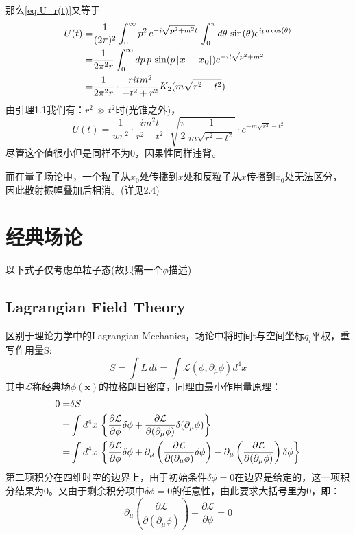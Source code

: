 \documentclass[../main.tex]{subfiles}
\begin{document}
    那么\eqref{eq:U_r(t)}又等于
    \begin{align}
        U(t) = & \frac{1}{(2\pi)^2} \int_{0}^{\infty} p^2 \, e^{-i\sqrt{\bm{p}^2 + m^2} t} \, \int_{0}^{\pi} d\theta\,\sin(\theta) e^{ipa \cos(\theta)} \notag \\
             = & \frac{1}{2\pi^2r} \int_{0}^{\infty} dp \, p\,\sin(p\left| \bm{x-x_0} \right|) e^{-it\sqrt{p^2+m^2}} \notag \\
             = & \frac{1}{2\pi^2r} \cdot \frac{ritm^2}{-t^2+r^2}K_2(m\sqrt{r^2-t^2})
    \end{align}
    由引理1.1我们有：$r^2 \gg t^2$时(光锥之外)，
    \begin{equation}
        U(t) = \frac{1}{w\pi^2} \cdot \frac{im^2t}{r^2-t^2} \cdot \sqrt{\frac{\pi}{2} \, \frac{1}{m\sqrt{r^2-t^2}}} \cdot e^{-m\sqrt{r^2}-t^2}
    \end{equation}
    尽管这个值很小但是同样不为0，因果性同样违背。

    而在量子场论中，一个粒子从$x_0$处传播到$x$处和反粒子从$x$传播到$x_0$处无法区分，因此散射振幅叠加后相消。(详见2.4)
\section{经典场论}
以下式子仅考虑单粒子态(故只需一个$\phi$描述)
\subsection{Lagrangian Field Theory}
    区别于理论力学中的Lagrangian Mechanics，场论中将时间t与空间坐标$q_i$平权，重写作用量S:
    \begin{equation}
        S = \int L\,dt = \int \mathcal{L} (\phi,\partial_{\mu}\phi)d^4x
    \end{equation}
    其中$\mathcal{L}$称经典场$\phi(\bm{x})$的拉格朗日密度，同理由最小作用量原理：
   \begin{align}
        0 = & \delta S \notag \\
          = & \int d^4x\,\left\{ \frac{\partial\mathcal{L}}{\partial \phi}\delta \phi + \frac{\partial \mathcal{L}}{\partial(\partial_{\mu}\phi)}\delta(\partial_{\mu}\phi) \right\} \notag \\
          = & \int d^4x\,\left\{ \frac{\partial\mathcal{L}}{\partial \phi}\delta \phi + \partial_{\mu}\left( \frac{\partial\mathcal{L}}{\partial(\partial_{\mu}\phi)}\delta\phi \right) - \partial_{\mu}\left( \frac{\partial\mathcal{L}}{\partial(\partial_{\mu}\phi)} \right)\delta\phi \right\}
    \end{align}
    第二项积分在四维时空的边界上，由于初始条件$\delta\phi = 0$在边界是给定的，这一项积分结果为0。又由于剩余积分项中$\delta\phi = 0$的任意性，由此要求大括号里为0，即：
    \begin{equation}
        \partial_{\mu}\left( \frac{\partial\mathcal{L}}{\partial(\partial_{\mu}\phi)} \right) - \frac{\partial\mathcal{L}}{\partial\phi} = 0
    \end{equation}
\end{document}
